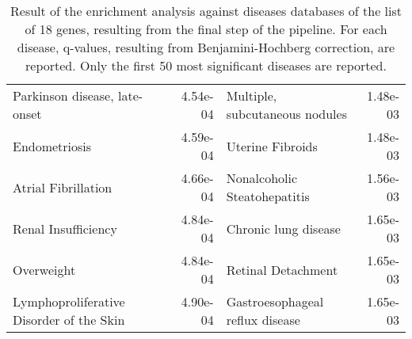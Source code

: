 \documentclass[fleqn,10pt]{SelfArx} %
\begin{document}
\begin{table}[ht]
\begin{tabularx}{\textwidth}{lRlR}
		Parkinson disease, late-onset & 4.54e-04 & Multiple, subcutaneous nodules & 1.48e-03 \\ 
		Endometriosis & 4.59e-04 & Uterine Fibroids & 1.48e-03 \\ 
		Atrial Fibrillation & 4.66e-04 & Nonalcoholic Steatohepatitis & 1.56e-03 \\ 
		Renal Insufficiency & 4.84e-04 & Chronic lung disease & 1.65e-03 \\ 
		Overweight & 4.84e-04 & Retinal Detachment & 1.65e-03 \\ 
		Lymphoproliferative Disorder of the Skin & 4.90e-04 & Gastroesophageal reflux disease & 1.65e-03 \\ 
	\end{tabularx}
	\smallskip
	\caption{Result of the enrichment analysis against diseases databases of the list of 18 genes, resulting from the final step of the pipeline. For each disease, q-values, resulting from Benjamini-Hochberg correction, are reported. Only the first 50 most significant diseases are reported.}
	\label{tab:diseases18}
\end{table}
\end{document}
